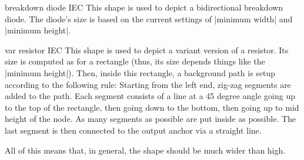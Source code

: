 \begin{shape}{breakdown diode IEC}
  This shape is used to depict a bidirectional breakdown diode. The
  diode's size is based on the current settings of |minimum width| and
  |minimum height|.
\begin{codeexample}[]
\end{codeexample}
\end{shape}

\begin{shape}{var resistor IEC}
  This shape is used to depict a variant version of a resistor. Its
  size is computed as for a rectangle (thus, its size depends things
  like the |minimum height|). Then, inside this rectangle, a
  background path is setup according to the following rule: Starting
  from the left end, zig-zag segments are added to the path. Each
  segment consists of a line at a 45 degree angle going up to the top
  of the rectangle, then going down to the bottom, then going up to
  mid height of the node. As many segments as possible are put inside
  as possible. The last segment is then connected to the output anchor
  via a straight line.

  All of this means that, in general, the shape should be much wider
  than high.
\begin{codeexample}[]
\end{codeexample}
\end{shape}



